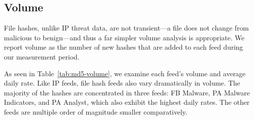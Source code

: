 \subsection{Volume}

File hashes, unlike IP threat data, are not transient---a file does
not change from malicious to benign---and thus a far simpler volume
analysis is appropriate. We report volume as the number of new hashes
that are added to each feed during our measurement period.

As seen in Table~\ref{tab:md5-volume}, we examine each feed's volume and
average daily rate. Like IP feeds, file hash feeds also vary dramatically in
volume. The majority of the hashes are concentrated in three feeds: FB Malware,
PA Malware Indicators, and PA Analyst, which also exhibit the highest daily rates.
The other feeds are multiple order of magnitude smaller comparatively.

